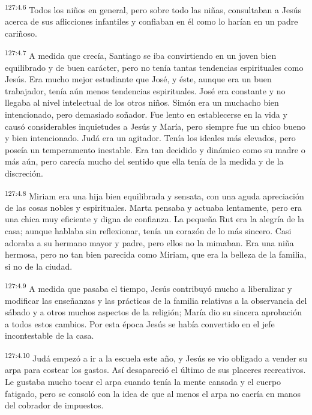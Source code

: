 \par 
\textsuperscript{127:4.6} Todos los niños en general, pero sobre todo las niñas, consultaban a Jesús acerca de sus aflicciones infantiles y confiaban en él como lo harían en un padre cariñoso.

\par 
\textsuperscript{127:4.7} A medida que crecía, Santiago se iba convirtiendo en un joven bien equilibrado y de buen carácter, pero no tenía tantas tendencias espirituales como Jesús. Era mucho mejor estudiante que José, y éste, aunque era un buen trabajador, tenía aún menos tendencias espirituales. José era constante y no llegaba al nivel intelectual de los otros niños. Simón era un muchacho bien intencionado, pero demasiado soñador. Fue lento en establecerse en la vida y causó considerables inquietudes a Jesús y María, pero siempre fue un chico bueno y bien intencionado. Judá era un agitador. Tenía los ideales más elevados, pero poseía un temperamento inestable. Era tan decidido y dinámico como su madre o más aún, pero carecía mucho del sentido que ella tenía de la medida y de la discreción.

\par 
\textsuperscript{127:4.8} Miriam era una hija bien equilibrada y sensata, con una aguda apreciación de las cosas nobles y espirituales. Marta pensaba y actuaba lentamente, pero era una chica muy eficiente y digna de confianza. La pequeña Rut era la alegría de la casa; aunque hablaba sin reflexionar, tenía un corazón de lo más sincero. Casi adoraba a su hermano mayor y padre, pero ellos no la mimaban. Era una niña hermosa, pero no tan bien parecida como Miriam, que era la belleza de la familia, si no de la ciudad.

\par 
\textsuperscript{127:4.9} A medida que pasaba el tiempo, Jesús contribuyó mucho a liberalizar y modificar las enseñanzas y las prácticas de la familia relativas a la observancia del sábado y a otros muchos aspectos de la religión; María dio su sincera aprobación a todos estos cambios. Por esta época Jesús se había convertido en el jefe incontestable de la casa.

\par 
\textsuperscript{127:4.10} Judá empezó a ir a la escuela este año, y Jesús se vio obligado a vender su arpa para costear los gastos. Así desapareció el último de sus placeres recreativos. Le gustaba mucho tocar el arpa cuando tenía la mente cansada y el cuerpo fatigado, pero se consoló con la idea de que al menos el arpa no caería en manos del cobrador de impuestos.

